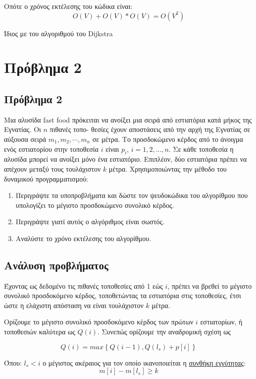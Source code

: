 \documentclass[11pt]{article}
\begin{document}
Οπότε ο χρόνος εκτέλεσης του κώδικα είναι:
\begin{equation}
\label{equdijstra}
O(V) + O(V)*O(V) = O(V^2)
\end{equation}

Ίδιος με του αλγοριθμού του Dijkstra
\section{Πρόβλημα 2}
\label{sec:org2eeb268}
\subsection{Πρόβλημα 2}
\label{sec:org3b5f20d}
Μια αλυσίδα fast food πρόκειται να ανοίξει μια σειρά από εστιατόρια κατά μήκος
της Εγνατίας. Οι \(n\) πιθανές τοπο- θεσίες έχουν αποστάσεις από την αρχή της
Εγνατίας σε αύξουσα σειρά \(m_1, m_2, \cdots, m_n\) σε μέτρα. Το προσδοκώμενο
κέρδος από το άνοιγμα ενός εστιατορίου στην τοποθεσία \(i\) είναι \(p_i\), \(i = 1,
2, ..., n\). Σε κάθε τοποθεσία η αλυσίδα μπορεί να ανοίξει μόνο ένα εστιατόριο.
Επιπλέον, δύο εστιατόρια πρέπει να απέχουν μεταξύ τους τουλάχιστον \(k\) μέτρα.
Χρησιμοποιώντας την μέθοδο του δυναμικού προγραμματισμού:
\begin{enumerate}
\item Περιγράψτε τα υποπροβλήματα και δώστε τον ψευδοκώδικα του αλγορίθμου που
υπολογίζει το μέγιστο προσδοκώμενο συνολικό κέρδος.
\item Περιγράψτε γιατί αυτός ο αλγόριθμος είναι σωστός.
\item Αναλύστε το χρόνο εκτέλεσης του αλγορίθμου.
\end{enumerate}
\subsection{Ανάλυση προβλήματος}
\label{sec:org0bdba4f}
Έχοντας ως δεδομένο τις πιθανές τοποθεσίες από 1 εώς \(i\), πρέπει να βρεθεί το
μέγιστο συνολικό προσδοκόμενο κέρδος, τοποθετώντας τα εστιατόρια στις
τοποθεσίες, έτσι ώστε η ελάχιστη απόσταση να είναι τουλάχιστον \(k\) μέτρα.

Ορίζουμε το μέγιστο συνολικό προσδοκόμενο κέρδος των πρώτων \(i\) εστιατορίων, ή
τοποθεσιών καλύτερα ως \(Q(i)\). Συνεπώς ορίζουμε την αναδρομική σχέση ως

\begin{equation}
\label{eq:1}
Q(i) = max \left\{ Q(i-1) , Q(l_s) + p[i] \right\}
\end{equation}

Όπου: \(l_s < i\) ο μέγιστος ακέραιος για τον οποίο ικανοποιείται η \uline{συνθήκη
εγγύτητας}: 
\begin{equation}
\label{eq:5}
m[i] - m[l_{s}] \geq k
\end{equation}
\end{document}
